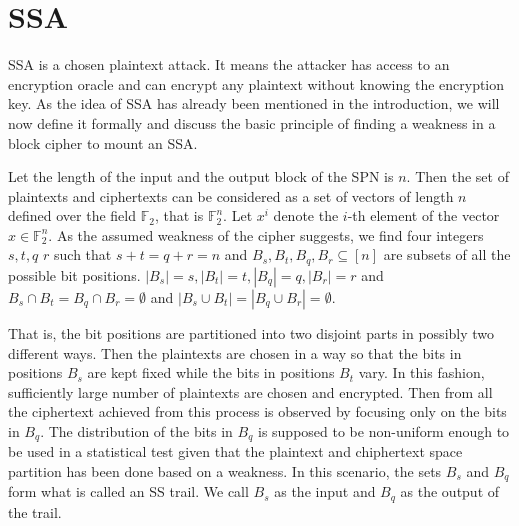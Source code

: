\section{SSA} \label{section:SSA}
SSA is a chosen plaintext attack. It means the attacker has access to an encryption oracle and can encrypt any plaintext without knowing the encryption key. As the idea of SSA has already been mentioned in the introduction, we will now define it formally and discuss the basic principle of finding a weakness in a block cipher to mount an SSA. \par \noindent Let the length of the input and the output block of the SPN is $n$. Then the set of plaintexts and ciphertexts can be considered as a set of vectors of length $n$ defined over the field $\mathbb{F}_2$, that is $\mathbb{F}_2^n$. Let $x^i$ denote the $i$-th element of the vector $x \in \mathbb{F}_2^n$.  As the assumed weakness of the cipher suggests, we find four integers $s,t,q$ $r$ such that $s+t = q+r = n$ and $B_s, B_t, B_q, B_r \subseteq [n]$ are subsets of all the possible bit positions. $|B_s| = s, |B_t|=t, |B_q| = q,|B_r|=r$ and $B_s \cap B_t = B_q \cap B_r = \emptyset$ and $|B_s \cup B_t| = |B_q \cup B_r| = \emptyset$. \par \noindent That is, the bit positions are partitioned into two disjoint parts in possibly two different ways. Then the plaintexts are chosen in a way so that the bits in positions $B_s$ are kept fixed while the bits in positions $B_t$ vary. In this fashion, sufficiently large number of plaintexts are chosen and encrypted. Then from all the ciphertext achieved from this process is observed by focusing only on the bits in $B_q$. The distribution of the bits in $B_q$ is supposed to be non-uniform enough to be used in a statistical test given that the plaintext and chiphertext space partition has been done based on a weakness. In this scenario, the sets $B_s$ and $B_q$ form what is called an SS trail. We call $B_s$ as the input and $B_q$ as the output of the trail.
